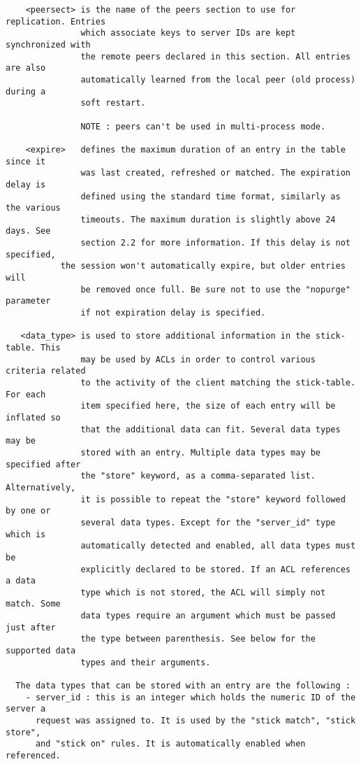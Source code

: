 \begin{verbatim}
    <peersect> is the name of the peers section to use for replication. Entries
               which associate keys to server IDs are kept synchronized with
               the remote peers declared in this section. All entries are also
               automatically learned from the local peer (old process) during a
               soft restart.

               NOTE : peers can't be used in multi-process mode.

    <expire>   defines the maximum duration of an entry in the table since it
               was last created, refreshed or matched. The expiration delay is
               defined using the standard time format, similarly as the various
               timeouts. The maximum duration is slightly above 24 days. See
               section 2.2 for more information. If this delay is not specified,
	       the session won't automatically expire, but older entries will
               be removed once full. Be sure not to use the "nopurge" parameter
               if not expiration delay is specified.

   <data_type> is used to store additional information in the stick-table. This
               may be used by ACLs in order to control various criteria related
               to the activity of the client matching the stick-table. For each
               item specified here, the size of each entry will be inflated so
               that the additional data can fit. Several data types may be
               stored with an entry. Multiple data types may be specified after
               the "store" keyword, as a comma-separated list. Alternatively,
               it is possible to repeat the "store" keyword followed by one or
               several data types. Except for the "server_id" type which is
               automatically detected and enabled, all data types must be
               explicitly declared to be stored. If an ACL references a data
               type which is not stored, the ACL will simply not match. Some
               data types require an argument which must be passed just after
               the type between parenthesis. See below for the supported data
               types and their arguments.

  The data types that can be stored with an entry are the following :
    - server_id : this is an integer which holds the numeric ID of the server a
      request was assigned to. It is used by the "stick match", "stick store",
      and "stick on" rules. It is automatically enabled when referenced.


\end{verbatim}

